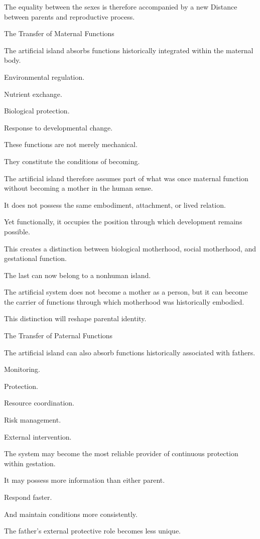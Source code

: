 The equality between the sexes is therefore accompanied by a new Distance between parents and reproductive process.

The Transfer of Maternal Functions

The artificial island absorbs functions historically integrated within the maternal body.

Environmental regulation.

Nutrient exchange.

Biological protection.

Response to developmental change.

These functions are not merely mechanical.

They constitute the conditions of becoming.

The artificial island therefore assumes part of what was once maternal function without becoming a mother in the human sense.

It does not possess the same embodiment, attachment, or lived relation.

Yet functionally, it occupies the position through which development remains possible.

This creates a distinction between biological motherhood, social motherhood, and gestational function.

The last can now belong to a nonhuman island.

The artificial system does not become a mother as a person, but it can become the carrier of functions through which motherhood was historically embodied.

This distinction will reshape parental identity.

The Transfer of Paternal Functions

The artificial island can also absorb functions historically associated with fathers.

Monitoring.

Protection.

Resource coordination.

Risk management.

External intervention.

The system may become the most reliable provider of continuous protection within gestation.

It may possess more information than either parent.

Respond faster.

And maintain conditions more consistently.

The father’s external protective role becomes less unique.

